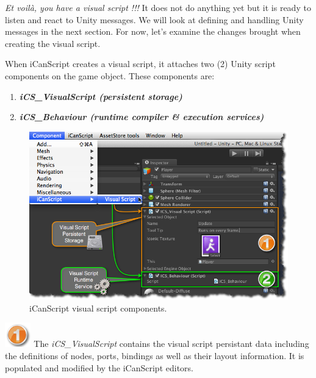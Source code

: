 \emph{Et voilà, you have a visual script !!!} It does not do anything yet but it is ready to listen and react to Unity messages. We will look at defining and handling Unity messages in the next section. For now, let's examine the changes brought when creating the visual script.

When iCanScript creates a visual script, it attaches two (2) Unity script components on the game object. These components are:

\begin{enumerate}
\item \emph{\textbf{iCS\_VisualScript (persistent storage)}}

\item \emph{\textbf{iCS\_Behaviour (runtime compiler \& execution services)}}

\end{enumerate}

\begin{figure}[htbp]
\centering
\includegraphics[keepaspectratio,width=\textwidth,height=0.75\textheight]{icanscript-components.png}
\caption{iCanScript visual script components.}
\label{icanscript-components.png}
\end{figure}

\includegraphics[width=32pt,height=30pt]{stamp-1-orange.png} The \emph{iCS\_VisualScript} contains the visual script persistant data including the definitions of nodes, ports, bindings as well as their layout information. It is populated and modified by the iCanScript editors.

